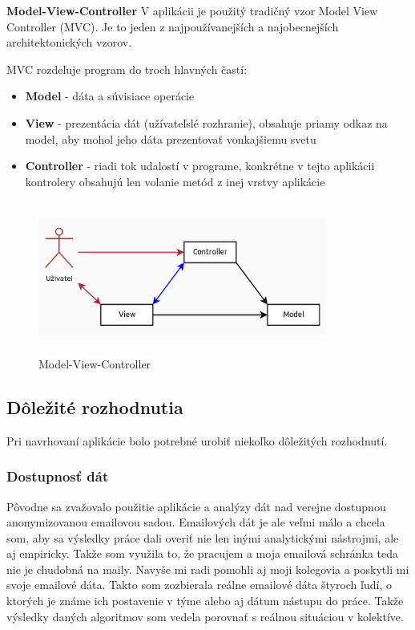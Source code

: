 \documentclass[slovak,master,public,dept460,male,cpdeclaration,oneside]{diploma}
\begin{document}
\textbf{Model-View-Controller}
V aplikácii je použitý tradičný vzor Model View Controller (MVC). Je to jeden z najpoužívanejších a najobecnejších architektonických vzorov. 

MVC rozdeľuje program do troch hlavných častí:
\begin{itemize}
\item \textbf{Model} - dáta a súvisiace operácie 
\item \textbf{View} - prezentácia dát (užívateľslé rozhranie), obsahuje priamy odkaz na model, aby mohol jeho dáta prezentovať vonkajšiemu svetu
\item \textbf{Controller} - riadi tok udalostí v programe, konkrétne v tejto aplikácii kontrolery obsahujú len volanie metód z inej vrstvy aplikácie
\end{itemize}

\begin{figure}[H]
\centering
\includegraphics[width=9.5cm, height=5cm]{figures/MVC}
\caption{Model-View-Controller}
\end{figure}


\subsection{Dôležité rozhodnutia}
Pri navrhovaní aplikácie bolo potrebné urobiť niekoľko dôležitých rozhodnutí.

\subsubsection{Dostupnosť dát}
Pôvodne sa zvažovalo použitie aplikácie a analýzy dát nad verejne dostupnou anonymizovanou emailovou sadou. Emailových dát je ale veľmi málo a chcela som, aby sa výsledky práce dali overiť nie len inými analytickými nástrojmi, ale aj empiricky. Takže som využila to, že pracujem a moja emailová schránka teda nie je chudobná na maily. Navyše mi radi pomohli aj moji kolegovia a poskytli mi svoje emailové dáta. Takto som zozbierala reálne emailové dáta štyroch ľudí, o ktorých je známe ich postavenie v týme alebo aj dátum nástupu do práce. Takže výsledky daných algoritmov som vedela porovnať s reálnou situáciou v kolektíve.
\end{document}
